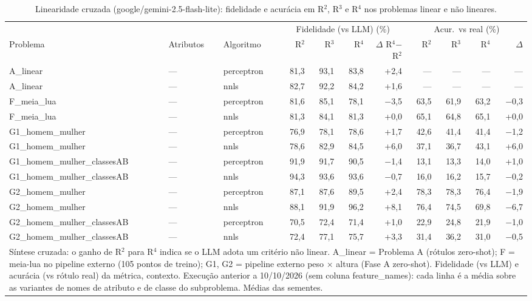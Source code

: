 \begin{table}[htbp]
\centering
\footnotesize
\caption{Linearidade cruzada (google/gemini-2.5-flash-lite): fidelidade e acurácia em R$^2$, R$^3$ e R$^4$ nos problemas linear e não lineares.}
\label{tab:final_linearidade_cruzada_R2_R3_R4_flashlite}
\begin{tabular}{lllrrrrrrrr}
\toprule
 &  &  & \multicolumn{4}{c}{Fidelidade (vs LLM) (\%)} & \multicolumn{4}{c}{Acur.\ vs real (\%)} \\ \cmidrule(lr){4-7} \cmidrule(lr){8-11}
Problema & Atributos & Algoritmo & R$^2$ & R$^3$ & R$^4$ & $\Delta$ R$^4$$-$R$^2$ & R$^2$ & R$^3$ & R$^4$ & $\Delta$ \\
\midrule
A\_linear & — & perceptron & 81,3 & 93,1 & 83,8 & +2,4 & — & — & — & — \\
A\_linear & — & nnls & 82,7 & 92,2 & 84,2 & +1,6 & — & — & — & — \\
\midrule
F\_meia\_lua & — & perceptron & 81,6 & 85,1 & 78,1 & $-$3,5 & 63,5 & 61,9 & 63,2 & $-$0,3 \\
F\_meia\_lua & — & nnls & 81,3 & 84,1 & 81,3 & +0,0 & 65,1 & 64,8 & 65,1 & +0,0 \\
\midrule
G1\_homem\_mulher & — & perceptron & 76,9 & 78,1 & 78,6 & +1,7 & 42,6 & 41,4 & 41,4 & $-$1,2 \\
G1\_homem\_mulher & — & nnls & 78,6 & 82,9 & 84,5 & +6,0 & 37,1 & 36,7 & 43,1 & +6,0 \\
\midrule
G1\_homem\_mulher\_classesAB & — & perceptron & 91,9 & 91,7 & 90,5 & $-$1,4 & 13,1 & 13,3 & 14,0 & +1,0 \\
G1\_homem\_mulher\_classesAB & — & nnls & 94,3 & 93,6 & 93,6 & $-$0,7 & 16,0 & 16,2 & 15,7 & $-$0,2 \\
\midrule
G2\_homem\_mulher & — & perceptron & 87,1 & 87,6 & 89,5 & +2,4 & 78,3 & 78,3 & 76,4 & $-$1,9 \\
G2\_homem\_mulher & — & nnls & 88,1 & 91,9 & 96,2 & +8,1 & 76,4 & 74,5 & 69,8 & $-$6,7 \\
\midrule
G2\_homem\_mulher\_classesAB & — & perceptron & 70,5 & 72,4 & 71,4 & +1,0 & 22,9 & 24,8 & 21,9 & $-$1,0 \\
G2\_homem\_mulher\_classesAB & — & nnls & 72,4 & 77,1 & 75,7 & +3,3 & 31,4 & 36,2 & 31,0 & $-$0,5 \\
\bottomrule
\multicolumn{11}{p{0.95\linewidth}}{\footnotesize Síntese cruzada: o ganho de R$^2$ para R$^4$ indica se o LLM adota um critério não linear. A\_linear = Problema A (rótulos zero-shot); F = meia-lua no pipeline externo (105 pontos de treino); G1, G2 = pipeline externo peso $\times$ altura (Fase A zero-shot). Fidelidade (vs LLM) e acurácia (vs rótulo real) da métrica, contexto. Execução anterior a 10/10/2026 (sem coluna feature\_names): cada linha é a média sobre as variantes de nomes de atributo e de classe do subproblema. Médias das sementes.} \\
\end{tabular}
\end{table}
